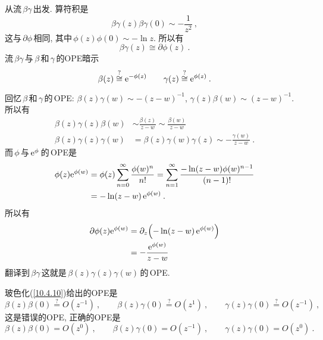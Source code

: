 从流$\,\beta\gamma\,$出发. 算符积是
\begin{equation}
    \beta\gamma(z)\beta\gamma(0) \sim -\frac{1}{z^{2}} \:, \label{10.4.8}
\end{equation}
这与$\,\partial\phi\,$相同, 其中$\,\phi(z)\phi(0)\sim -\ln z$. 所以有
\begin{equation}
    \beta\gamma(z)\cong \partial\phi(z)\:. \label{10.4.9}
\end{equation}
流$\,\beta\gamma\,$与$\,\beta\,$和$\,\gamma\,$的OPE暗示
\begin{equation}
    \beta(z)\overset{?}{\cong} \mathrm{e}^{-\phi(z)} \qquad
    \gamma(z)\overset{?}{\cong} \mathrm{e}^{\phi(z)} \:. \label{10.4.10}
\end{equation}
\begin{tcolorbox}
    回忆$\,\beta\,$和$\,\gamma\,$的\,OPE: $\beta(z)\gamma(w)\sim -(z-w)^{-1}$, $\gamma(z)\beta(w)\sim(z-w)^{-1}$. 所以有
    \begin{align*}
        \beta(z)\gamma(z)\beta(w)&\sim \frac{\beta(z)}{z-w} \sim \frac{\beta(w)}{z-w} \\
        \beta(z)\gamma(z)\gamma(w)&= \beta(z)\gamma(w)\gamma(z) \sim -\frac{\gamma(w)}{z-w} \:.
    \end{align*}
    而$\,\phi\,$与$\,\mathrm{e}^{\phi}\,$的\,OPE是
    \begin{align*}
        \phi(z)\mathrm{e}^{\phi(w)} &=\phi(z) \sum_{n=0}^{\infty}\frac{\phi(w)^{n}}{n!}=
        \sum_{n=1}^{\infty}\frac{-\ln(z-w)\phi(w)^{n-1}}{(n-1)!}\\
        &=-\ln(z-w)\,\mathrm{e}^{\phi(w)} \:.
    \end{align*}
    所以有
    \begin{align*}
       \partial\phi(z)\mathrm{e}^{\phi(w)}& =\partial_{z} \Bigl(-\ln(z-w)\,\mathrm{e}^{\phi(w)}\Bigr) \\
       &= -\frac{\mathrm{e}^{\phi(w)}}{z-w}
    \end{align*}
    翻译到$\,\beta\gamma\,$这就是$\,\beta(z)\gamma(z)\gamma(w)\,$的\,OPE.
\end{tcolorbox}
\noindent 玻色化(\ref{10.4.10})给出的OPE是
\begin{equation}
    \beta(z)\beta(0) \overset{?}{=} O(z^{-1}) \:,\qquad 
    \beta(z)\gamma(0)\overset{?}{=} O(z^{1}) \:, \qquad
    \gamma(z)\gamma(0) \overset{?}{=} O(z^{-1}) \:, \label{10.4.11}
\end{equation}
这是错误的OPE, 正确的OPE是
\begin{equation}
    \beta(z)\beta(0) = O(z^{0}) \:,\qquad 
    \beta(z)\gamma(0)= O(z^{-1}) \:, \qquad
    \gamma(z)\gamma(0) = O(z^{0}) \:. \label{10.4.12}
\end{equation}
